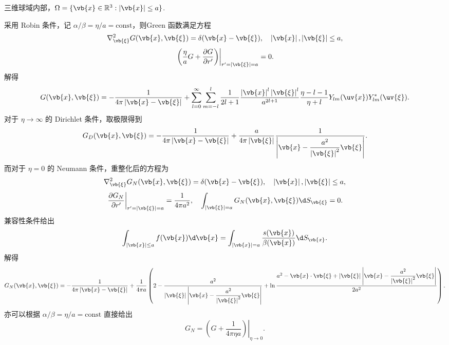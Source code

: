 \begin{example}
	三维球域内部，\(\Omega=\{\vb{x}\in\mathbb{R}^3:\left|\vb{x}\right|\leq a\}\).
	
	采用 Robin 条件，记 \(\alpha/\beta=\eta/a=\mathrm{const}\)，则Green 函数满足方程
	\begin{equation*}
		\nabla_{\vb{\xi}}^2G(\vb{x},\vb{\xi})=\delta(\vb{x}-\vb{\xi}),\quad
		\left|\vb{x}\right|,\left|\vb{\xi}\right|\leq a,
	\end{equation*}
	\begin{equation*}
		\left.\left(\frac{\eta}{a}G+\frac{\partial G}{\partial r'}\right)\right|_{r'=\left|\vb{\xi}\right|=a}=0.
	\end{equation*}
	解得
	\begin{equation*}
		G(\vb{x},\vb{\xi})
		=-\frac{1}{4\pi\left|\vb{x}-\vb{\xi}\right|}
		+\sum_{l=0}^\infty\sum_{m=-l}^l\frac{1}{2l+1}\frac{\left|\vb{x}\right|^l\left|\vb{\xi}\right|^l}{a^{2l+1}}\frac{\eta-l-1}{\eta+l}Y_{lm}(\uv{x})Y_{lm}^*(\uv{\xi}).
	\end{equation*}
	对于 \(\eta\to\infty\) 的 Dirichlet 条件，取极限得到
	\begin{equation*}
		G_D(\vb{x},\vb{\xi})
		=-\frac{1}{4\pi\left|\vb{x}-\vb{\xi}\right|}
		+\frac{a}{4\pi\left|\vb{\xi}\right|}\frac{1}{\left|\vb{x}-\dfrac{a^2}{\left|\vb{\xi}\right|^2}\vb{\xi}\right|}.
	\end{equation*}
	而对于 \(\eta=0\) 的 Neumann 条件，重整化后的方程为
	\begin{equation*}
		\nabla_{\vb{\xi}}^2G_N(\vb{x},\vb{\xi})=\delta(\vb{x}-\vb{\xi}),\quad
		\left|\vb{x}\right|,\left|\vb{\xi}\right|\leq a,
	\end{equation*}
	\begin{equation*}
		\left.\frac{\partial G_N}{\partial r'}\right|_{r'=\left|\vb{\xi}\right|=a}=\frac{1}{4\pi a^2},\quad
		\int_{\left|\vb{\xi}\right|=a}G_N(\vb{x},\vb{\xi})\d S_{\vb{\xi}}=0.
	\end{equation*}
	兼容性条件给出
	\begin{equation*}
		\int_{\left|\vb{x}\right|\leq a}f(\vb{x})\d\vb{x}
		=\int_{\left|\vb{x}\right|=a}\frac{s(\vb{x})}{\beta(\vb{x})}\d S_{\vb{x}}.
	\end{equation*}
	解得
	\begin{equation*}
		G_N(\vb{x},\vb{\xi})
		=-\frac{1}{4\pi\left|\vb{x}-\vb{\xi}\right|}
		+\frac{1}{4\pi a}\left(2-\frac{a^2}{\left|\vb{\xi}\right|\left|\vb{x}-\dfrac{a^2}{\left|\vb{\xi}\right|^2}\vb{\xi}\right|}
		+\ln\frac{a^2-\vb{x}\cdot\vb{\xi}+\left|\vb{\xi}\right|\left|\vb{x}-\dfrac{a^2}{\left|\vb{\xi}\right|^2}\vb{\xi}\right|}{2a^2}\right).
	\end{equation*}
	亦可以根据 \(\alpha/\beta=\eta/a=\mathrm{const}\) 直接给出
	\begin{equation*}
		G_N=\left.\left(G+\frac{1}{4\pi\eta a}\right)\right|_{\eta\to0}.
	\end{equation*}
\end{example}

